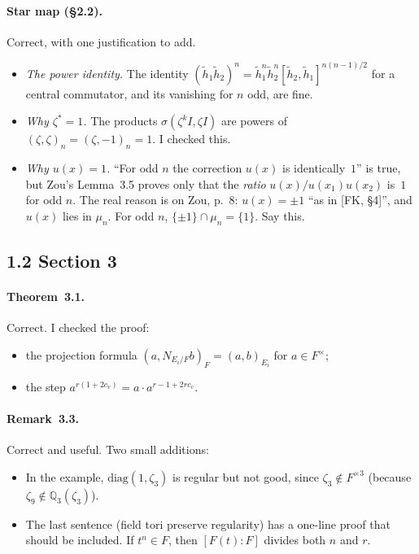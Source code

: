 \documentclass[11pt]{article}
\begin{document}
\paragraph{Star map (\S2.2).} Correct, with one justification to add.
\begin{itemize}
\item \emph{The power identity.} The identity
$(\tilde h_1\tilde h_2)^n=\tilde h_1^n\tilde h_2^n[\tilde h_2,\tilde h_1]^{n(n-1)/2}$
for a central commutator, and its vanishing for $n$ odd, are fine.
\item \emph{Why $\zeta^*=1$.} The products $\sigma(\zeta^kI,\zeta I)$ are
powers of $(\zeta,\zeta)_n=(\zeta,-1)_n=1$. I checked this.
\item \emph{Why $u(x)=1$.} ``For odd $n$ the correction $u(x)$ is
identically~$1$'' is true, but Zou's Lemma~3.5 proves only that the
\emph{ratio} $u(x)/u(x_1)u(x_2)$ is~$1$ for odd $n$. The real reason is
on Zou, p.~8: $u(x)=\pm1$ ``as in [FK, \S4]'', and $u(x)$ lies in
$\mu_n$. For odd $n$, $\{\pm1\}\cap\mu_n=\{1\}$. Say this.
\end{itemize}

\subsection*{1.2 Section 3}
\paragraph{Theorem~3.1.} Correct. I checked the proof:
\begin{itemize}
\item the projection formula $(a,N_{E_i/F}b)_F=(a,b)_{E_i}$ for
$a\in F^\times$;
\item the step $a^{r(1+2c_v)}=a\cdot a^{r-1+2rc_v}$.
\end{itemize}

\paragraph{Remark~3.3.} Correct and useful. Two small additions:
\begin{itemize}
\item In the example, $\mathrm{diag}(1,\zeta_3)$ is regular but not good,
since $\zeta_3\notin F^{\times3}$ (because $\zeta_9\notin\mathbb Q_3(\zeta_3)$).
\item The last sentence (field tori preserve regularity) has a one-line
proof that should be included. If $t^n\in F$, then $[F(t):F]$ divides
both $n$ and $r$.
\end{itemize}
\end{document}
